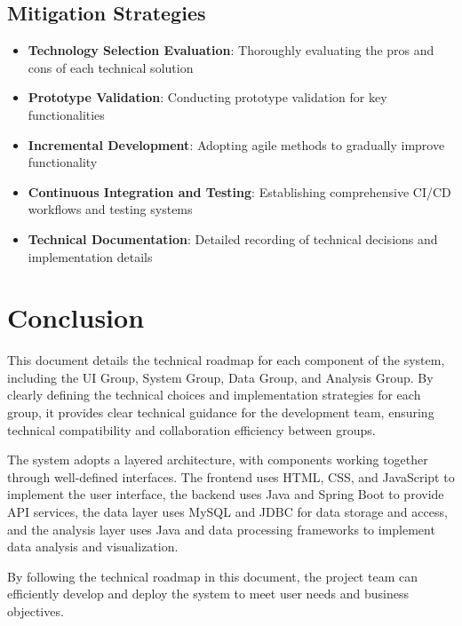 \documentclass[a4paper,12pt]{article}
\begin{document}
\subsection{Mitigation Strategies}

\begin{itemize}
  \item \textbf{Technology Selection Evaluation}: Thoroughly evaluating the pros and cons of each technical solution
  \item \textbf{Prototype Validation}: Conducting prototype validation for key functionalities
  \item \textbf{Incremental Development}: Adopting agile methods to gradually improve functionality
  \item \textbf{Continuous Integration and Testing}: Establishing comprehensive CI/CD workflows and testing systems
  \item \textbf{Technical Documentation}: Detailed recording of technical decisions and implementation details
\end{itemize}

\section{Conclusion}

This document details the technical roadmap for each component of the system, including the UI Group, System Group, Data Group, and Analysis Group. By clearly defining the technical choices and implementation strategies for each group, it provides clear technical guidance for the development team, ensuring technical compatibility and collaboration efficiency between groups.

The system adopts a layered architecture, with components working together through well-defined interfaces. The frontend uses HTML, CSS, and JavaScript to implement the user interface, the backend uses Java and Spring Boot to provide API services, the data layer uses MySQL and JDBC for data storage and access, and the analysis layer uses Java and data processing frameworks to implement data analysis and visualization.

By following the technical roadmap in this document, the project team can efficiently develop and deploy the system to meet user needs and business objectives.
\end{document}

